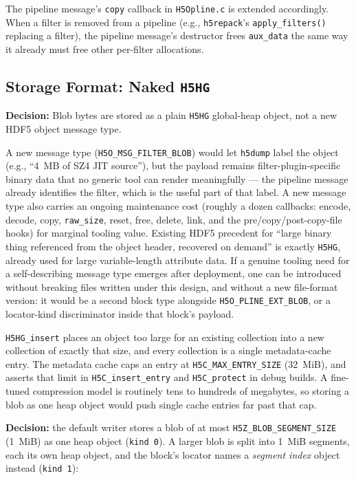 \documentclass[../RFC-HDFG-2026-003.tex]{subfiles}
\begin{document}
The pipeline message's \texttt{copy} callback in \texttt{H5Opline.c} is
extended accordingly. When a filter is removed from a pipeline (e.g.,
\texttt{h5repack}'s \texttt{apply\_filters()} replacing a filter), the
pipeline message's destructor frees \texttt{aux\_data} the same way it
already must free other per-filter allocations.

\subsection{Storage Format: Naked \texttt{H5HG}}
\label{sec:blob-storage-format}

\noindent\textbf{Decision:} Blob bytes are stored as a plain
\texttt{H5HG} global-heap object, not a new HDF5 object message type.

A new message type (\texttt{H5O\_MSG\_FILTER\_BLOB}) would let
\texttt{h5dump} label the object (e.g., ``4~MB of SZ4 JIT source''), but
the payload remains filter-plugin-specific binary data that no generic
tool can render meaningfully --- the pipeline message already identifies
the filter, which is the useful part of that label. A new message type
also carries an ongoing maintenance cost (roughly a dozen callbacks:
encode, decode, copy, \texttt{raw\_size}, reset, free, delete, link, and
the pre/copy/post-copy-file hooks) for marginal tooling value. Existing
HDF5 precedent for ``large binary thing referenced from the object
header, recovered on demand'' is exactly \texttt{H5HG}, already used for
large variable-length attribute data. If a genuine tooling need for a
self-describing message type emerges after deployment, one can be
introduced without breaking files written under this design, and without
a new file-format version: it would be a second block type alongside
\texttt{H5O\_PLINE\_EXT\_BLOB}, or a locator-kind discriminator inside
that block's payload.


\texttt{H5HG\_insert} places an object too large for an existing
collection into a new collection of exactly that size, and every
collection is a single metadata-cache entry.  The metadata cache caps an
entry at \texttt{H5C\_MAX\_ENTRY\_SIZE} (32~MiB), and asserts that limit in
\texttt{H5C\_insert\_entry} and \texttt{H5C\_protect} in debug builds.  A
fine-tuned compression model is routinely tens to hundreds of megabytes,
so storing a blob as one heap object would push single cache entries far
past that cap.

\noindent\textbf{Decision:} the default writer stores a blob of at most
\texttt{H5Z\_BLOB\_SEGMENT\_SIZE} (1~MiB) as one heap object (\texttt{kind~0}).
A larger blob is split into 1~MiB segments, each its own heap object, and
the block's locator names a \emph{segment index} object instead
(\texttt{kind~1}):
\end{document}
